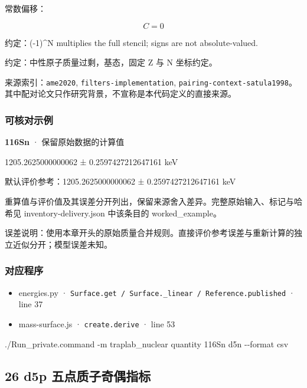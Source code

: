 \documentclass[
  11pt,
  letterpaper,
]{article}
\newenvironment{Shaded}{}{}
\newcommand{\AttributeTok}[1]{\textcolor[rgb]{0.49,0.56,0.16}{#1}}
\newcommand{\ExtensionTok}[1]{#1}
\newcommand{\NormalTok}[1]{#1}
\providecommand{\tightlist}{%
  \setlength{\itemsep}{0pt}\setlength{\parskip}{0pt}}
\begin{document}
常数偏移：

\[
C=0
\]

约定：(-1)\^{}N multiplies the full stencil; signs are not
absolute-valued.

约定：中性原子质量过剩，基态，固定 Z 与 N 坐标约定。

来源索引：\texttt{ame2020}, \texttt{filters-implementation},
\texttt{pairing-context-satula1998}。其中配对论文只作研究背景，不宣称是本代码定义的直接来源。

\subsubsection{可核对示例}\label{ux53efux6838ux5bf9ux793aux4f8b-24}

\textbf{116Sn} · 保留原始数据的计算值

1205.2625000000062 ± 0.2597427212647161 keV

默认评价参考：1205.2625000000062 ± 0.2597427212647161 keV

重算值与评价值及其误差分开列出，保留来源舍入差异。完整原始输入、标记与哈希见
inventory-delivery.json 中该条目的 worked\_example。

误差说明：使用本章开头的原始质量合并规则。直接评价参考误差与重新计算的独立近似分开；模型误差未知。

\subsubsection{对应程序}\label{ux5bf9ux5e94ux7a0bux5e8f-24}

\begin{itemize}
\tightlist
\item
  energies.py ·
  \texttt{Surface.get\ /\ Surface.\_linear\ /\ Reference.published} ·
  line 37
\item
  mass-surface.js · \texttt{create.derive} · line 53
\end{itemize}

\begin{Shaded}
\begin{Highlighting}[]
\ExtensionTok{./Run\_private.command} \AttributeTok{{-}m}\NormalTok{ traplab\_nuclear quantity 116Sn d5n }\AttributeTok{{-}{-}format}\NormalTok{ csv}
\end{Highlighting}
\end{Shaded}

\subsection{26 d5p
五点质子奇偶指标}\label{d5p-ux4e94ux70b9ux8d28ux5b50ux5947ux5076ux6307ux6807}
\end{document}
